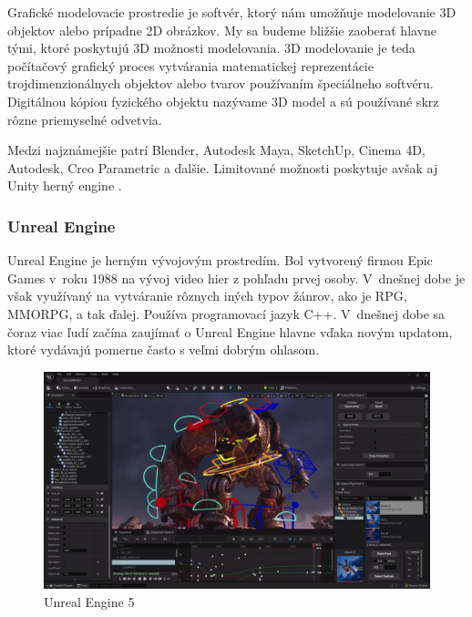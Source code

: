 Grafické modelovacie prostredie je softvér, ktorý nám umožňuje modelovanie 3D objektov alebo prípadne 2D obrázkov. My sa budeme bližšie zaoberať hlavne tými, ktoré poskytujú 3D možnosti modelovania. 3D modelovanie je teda počítačový grafický proces vytvárania matematickej reprezentácie trojdimenzionálnych objektov alebo tvarov používaním špeciálneho softvéru. Digitálnou kópiou fyzického objektu nazývame 3D model a sú používané skrz rôzne priemyselné odvetvia. 

Medzi najznámejšie patrí Blender, Autodesk Maya, SketchUp, Cinema 4D, Autodesk, Creo Parametric a ďalšie. Limitované možnosti poskytuje avšak aj Unity herný engine \cite{autodesk2024modelingsoftware}. 

\subsubsection{Unreal Engine}

Unreal Engine je herným vývojovým prostredím. Bol vytvorený firmou Epic Games v~roku 1988 na vývoj video hier z pohľadu prvej osoby. V~dnešnej dobe je však využívaný na vytváranie rôznych iných typov žánrov, ako je RPG, MMORPG, a tak ďalej. Používa programovací jazyk C++. V~dnešnej dobe sa čoraz viac ľudí začína zaujímať o Unreal Engine hlavne vďaka novým updatom, ktoré vydávajú pomerne často s veľmi dobrým ohlasom. %

\begin{figure}[h]
\centering
\includegraphics[width=1\textwidth]{img/unreal_engine_5.png}
\caption{Unreal Engine 5 \cite{unrealengine5}}
\label{fig:unrealengine5}
\end{figure}

